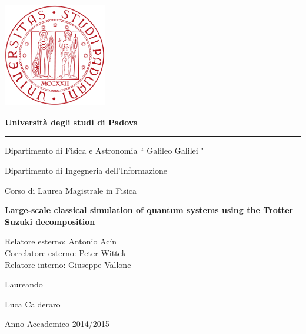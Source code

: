 \begin{titlepage}

\setlength{}
\setlength{}

\begin{center}
\vspace*{-2. cm}
\includegraphics[width=4.5cm]{Figs/Logo_Universita_Padova.png}
\vspace*{1 cm}

{\bfseries{\huge Universit\`a degli studi di Padova} }
\hrule

\vspace{1 cm}

{\Large Dipartimento di Fisica e Astronomia  `` Galileo Galilei "} 

\vspace{0.5cm}

{\Large Dipartimento di Ingegneria dell'Informazione} 
\vspace{1cm}

{\Large Corso di Laurea Magistrale in} 
{\Large Fisica}

\vspace{1.5 cm}

{\LARGE{\bfseries {Large-scale classical simulation of quantum systems using the Trotter--Suzuki decomposition}}} 
\end{center}

\vfill
\raggedright     
\large{Relatore esterno: Antonio Acín}  \\
\vspace{0.08cm}
\large{Correlatore esterno: Peter Wittek}  \\
\vspace{0.08 cm}
\large{Relatore interno: Giuseppe Vallone}  \\
\vspace{0.08cm}

\raggedleft
\large{Laureando}

\large{Luca Calderaro} 

\vspace{2cm}
\begin{center}
{\large{ Anno Accademico 2014/2015}}
\end{center}
\vspace{-1.5cm}

\end{titlepage}